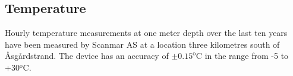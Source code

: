 \subsection{Temperature}
\label{subsec:tempeo}
Hourly temperature measurements at one meter depth over the last ten years have been measured by Scanmar AS at a location three kilometres south of {\AA}sg{\aa}rdstrand. The device has an accuracy of $\pm 0.15^{\textrm{o}}$C in the range from -5 to +30$^{\textrm{o}}$C. 


